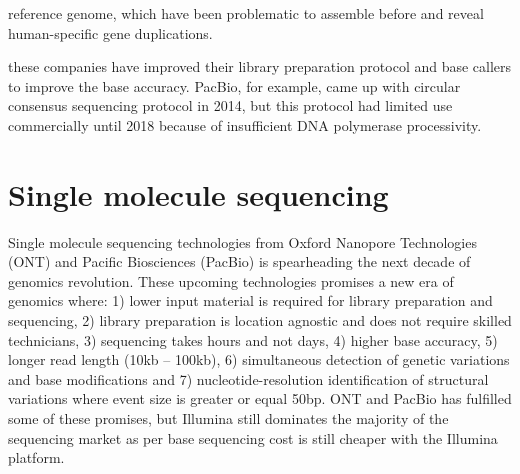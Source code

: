 reference genome, which have been problematic to assemble before and reveal human-specific gene duplications.   

these companies have improved their library preparation protocol and base callers to improve the base accuracy. PacBio, for example, came up with circular consensus sequencing protocol in 2014, but this protocol had limited use commercially until 2018 because of insufficient DNA polymerase processivity.   









\section{Single molecule sequencing}

Single molecule sequencing technologies from Oxford Nanopore Technologies (ONT) and Pacific Biosciences (PacBio) is spearheading the next decade of genomics revolution. These upcoming technologies promises a new era of genomics where: 1) lower input material is required for library preparation and sequencing, 2) library preparation is location agnostic and does not require skilled technicians, 3) sequencing takes hours and not days, 4) higher base accuracy, 5) longer read length (10kb – 100kb), 6) simultaneous detection of genetic variations and base modifications and 7) nucleotide-resolution identification of structural variations where event size is greater or equal 50bp. ONT and PacBio has fulfilled some of these promises, but Illumina still dominates the majority of the sequencing market as per base sequencing cost is still cheaper with the Illumina platform.

